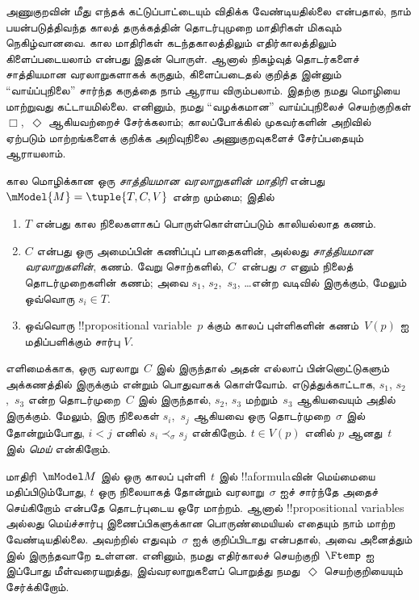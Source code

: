 \documentclass[../../../include/open-logic-section]{subfiles}
\begin{document}


அணுகுறவின் மீது எந்தக் கட்டுப்பாட்டையும் விதிக்க வேண்டியதில்லை என்பதால், நாம்
பயன்படுத்திவந்த காலத் தருக்கத்தின் தொடர்புமுறை மாதிரிகள் மிகவும்
நெகிழ்வானவை. கால மாதிரிகள் கடந்தகாலத்திலும் எதிர்காலத்திலும் கிளைப்படையலாம்
என்பது இதன் பொருள். ஆனால் நிகழ்வுத் தொடர்களைச் சாத்தியமான வரலாறுகளாகக்
கருதும், கிளைப்படைதல் குறித்த இன்னும் ``வாய்ப்புநிலை'' சார்ந்த கருத்தை நாம்
ஆராய விரும்பலாம். இதற்கு நமது மொழியை மாற்றுவது கட்டாயமில்லை. எனினும், நமது
``வழக்கமான'' வாய்ப்புநிலைச் செயற்குறிகள் $\Box$,~$\Diamond$ ஆகியவற்றைச்
சேர்க்கலாம்; காலப்போக்கில் முகவர்களின் அறிவில் ஏற்படும் மாற்றங்களைக் குறிக்க
அறிவுநிலை அணுகுறவுகளைச் சேர்ப்பதையும் ஆராயலாம்.

\begin{defn}
  கால மொழிக்கான ஒரு \emph{சாத்தியமான வரலாறுகளின் மாதிரி} என்பது
  $\mModel{M} = \tuple{T, C, V}$ என்ற மும்மை; இதில்
  \begin{enumerate}
    \item $T$ என்பது கால நிலைகளாகப் பொருள்கொள்ளப்படும் காலியல்லாத கணம்.
    \item $C$ என்பது ஒரு அமைப்பின் கணிப்புப் பாதைகளின், அல்லது
      \emph{சாத்தியமான வரலாறுகளின்}, கணம். வேறு சொற்களில், $C$~என்பது
      $\sigma$ எனும் நிலைத் தொடர்முறைகளின் கணம்; அவை $s_1$, $s_2$,~$s_3$,
      \dots என்ற வடிவில் இருக்கும், மேலும் ஒவ்வொரு $s_i \in T$.
    \item ஒவ்வொரு !!{propositional variable}~$p$ க்கும் காலப் புள்ளிகளின்
      கணம்~$V(p)$ ஐ மதிப்பளிக்கும் சார்பு $V$.
  \end{enumerate}
  எளிமைக்காக, ஒரு வரலாறு~$C$ இல் இருந்தால் அதன் எல்லாப் பின்னொட்டுகளும்
  அக்கணத்தில் இருக்கும் என்றும் பொதுவாகக் கொள்வோம். எடுத்துக்காட்டாக, $s_1$,
  $s_2$,~$s_3$ என்ற தொடர்முறை~$C$ இல் இருந்தால், $s_2$, $s_3$ மற்றும்~$s_3$
  ஆகியவையும் அதில் இருக்கும். மேலும், இரு நிலைகள் $s_i$,~$s_j$ ஆகியவை ஒரு
  தொடர்முறை~$\sigma$ இல் தோன்றும்போது, $i < j$ எனில் $s_i \prec_\sigma s_j$
  என்கிறோம். $t \in V(p)$ எனில் $p$ ஆனது~$t$ இல் \emph{மெய்} என்கிறோம்.
\end{defn}

மாதிரி~$\mModel M$ இல் ஒரு காலப் புள்ளி~$t$ இல் !!a{formula}வின் மெய்மையை
மதிப்பிடும்போது, $t$ ஒரு நிலையாகத் தோன்றும் வரலாறு~$\sigma$ ஐச் சார்ந்தே
அதைச் செய்கிறோம் என்பதே தொடர்புடைய ஒரே மாற்றம். ஆனால் !!{propositional
variable}s அல்லது மெய்ச்சார்பு இணைப்பிகளுக்கான பொருண்மையியல் எதையும் நாம்
மாற்ற வேண்டியதில்லை. அவற்றில் எதுவும்~$\sigma$ ஐக் குறிப்பிடாது என்பதால்,
அவை அனைத்தும்  இல் இருந்தவாறே உள்ளன. எனினும்,
நமது எதிர்காலச் செயற்குறி~$\Ftemp$ ஐ இப்போது மீள்வரையறுத்து,
இவ்வரலாறுகளைப் பொறுத்து நமது~$\Diamond$ செயற்குறியையும் சேர்க்கிறோம்.
\end{document}

